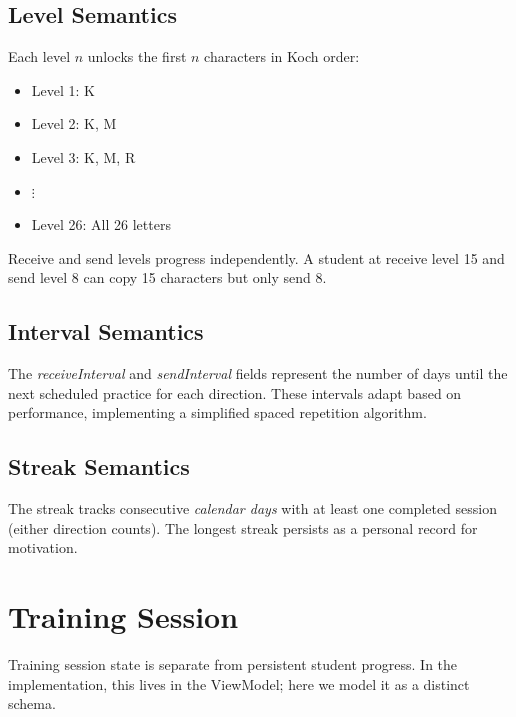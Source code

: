 \documentclass[a4paper,10pt,fleqn]{article}
\begin{document}
\subsection{Level Semantics}

Each level $n$ unlocks the first $n$ characters in Koch order:
\begin{itemize}
\item Level 1: K
\item Level 2: K, M
\item Level 3: K, M, R
\item $\vdots$
\item Level 26: All 26 letters
\end{itemize}

Receive and send levels progress independently. A student at receive level 15
and send level 8 can copy 15 characters but only send 8.

\subsection{Interval Semantics}

The \emph{receiveInterval} and \emph{sendInterval} fields represent the number
of days until the next scheduled practice for each direction. These intervals
adapt based on performance, implementing a simplified spaced repetition algorithm.

\subsection{Streak Semantics}

The streak tracks consecutive \emph{calendar days} with at least one completed
session (either direction counts). The longest streak persists as a personal
record for motivation.

\section{Training Session}

Training session state is separate from persistent student progress. In the
implementation, this lives in the ViewModel; here we model it as a distinct
schema.
\end{document}
